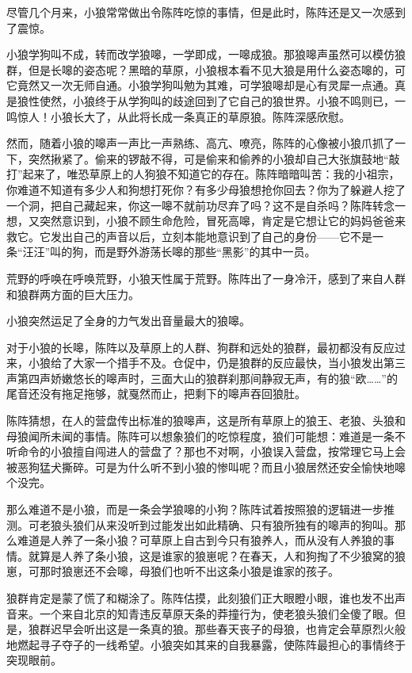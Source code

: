 \par 尽管几个月来，小狼常常做出令陈阵吃惊的事情，但是此时，陈阵还是又一次感到了震惊。
\par 小狼学狗叫不成，转而改学狼嗥，一学即成，一嗥成狼。那狼嗥声虽然可以模仿狼群，但是长嗥的姿态呢？黑暗的草原，小狼根本看不见大狼是用什么姿态嗥的，可它竟然又一次无师自通。小狼学狗叫勉为其难，可学狼嗥却是心有灵犀一点通。真是狼性使然，小狼终于从学狗叫的歧途回到了它自己的狼世界。小狼不鸣则已，一鸣惊人！小狼长大了，从此将长成一条真正的草原狼。陈阵深感欣慰。
\par 然而，随着小狼的嗥声一声比一声熟练、高亢、嘹亮，陈阵的心像被小狼爪抓了一下，突然揪紧了。偷来的锣敲不得，可是偷来和偷养的小狼却自己大张旗鼓地“敲打”起来了，唯恐草原上的人狗狼不知道它的存在。陈阵暗暗叫苦：我的小祖宗，你难道不知道有多少人和狗想打死你？有多少母狼想抢你回去？你为了躲避人挖了一个洞，把自己藏起来，你这一嗥不就前功尽弃了吗？这不是自杀吗？陈阵转念一想，又突然意识到，小狼不顾生命危险，冒死高嗥，肯定是它想让它的妈妈爸爸来救它。它发出自己的声音以后，立刻本能地意识到了自己的身份——它不是一条“汪汪”叫的狗，而是野外游荡长嗥的那些“黑影”的其中一员。
\par 荒野的呼唤在呼唤荒野，小狼天性属于荒野。陈阵出了一身冷汗，感到了来自人群和狼群两方面的巨大压力。
\par 小狼突然运足了全身的力气发出音量最大的狼嗥。
\par 对于小狼的长嗥，陈阵以及草原上的人群、狗群和远处的狼群，最初都没有反应过来，小狼给了大家一个措手不及。仓促中，仍是狼群的反应最快，当小狼发出第三声第四声娇嫩悠长的嗥声时，三面大山的狼群刹那间静寂无声，有的狼“欧……”的尾音还没有拖足拖够，就戛然而止，把剩下的嗥声吞回狼肚。
\par 陈阵猜想，在人的营盘传出标准的狼嗥声，这是所有草原上的狼王、老狼、头狼和母狼闻所未闻的事情。陈阵可以想象狼们的吃惊程度，狼们可能想：难道是一条不听命令的小狼擅自闯进人的营盘了？那也不对啊，小狼误入营盘，按常理它马上会被恶狗猛犬撕碎。可是为什么听不到小狼的惨叫呢？而且小狼居然还安全愉快地嗥个没完。
\par 那么难道不是小狼，而是一条会学狼嗥的小狗？陈阵试着按照狼的逻辑进一步推测。可老狼头狼们从来没听到过能发出如此精确、只有狼所独有的嗥声的狗叫。那么难道是人养了一条小狼？可草原上自古到今只有狼养人，而从没有人养狼的事情。就算是人养了条小狼，这是谁家的狼崽呢？在春天，人和狗掏了不少狼窝的狼崽，可那时狼崽还不会嗥，母狼们也听不出这条小狼是谁家的孩子。
\par 狼群肯定是蒙了慌了和糊涂了。陈阵估摸，此刻狼们正大眼瞪小眼，谁也发不出声音来。一个来自北京的知青违反草原天条的莽撞行为，使老狼头狼们全傻了眼。但是，狼群迟早会听出这是一条真的狼。那些春天丧子的母狼，也肯定会草原烈火般地燃起寻子夺子的一线希望。小狼突如其来的自我暴露，使陈阵最担心的事情终于突现眼前。
